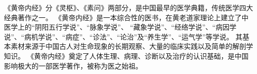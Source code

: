 《黄帝内经》分《灵枢》、《素问》两部分，是中国最早的医学典籍，传统医学四大经典著作之一。
《黄帝内经》是一本综合性的医书，在黄老道家理论上建立了中医学上的“阴阳五行学说”、“脉象学说”、
“藏象学说”、“经络学说”、“病因学说”、“病机学说”、“病症”、“诊法”、“论治”及“养生学”、“运气学”等学说。
其基本素材来源于中国古人对生命现象的长期观察、大量的临床实践以及简单的解剖学知识。
《黄帝内经》奠定了人体生理、病理、诊断以及治疗的认识基础，是中国影响极大的一部医学著作，被称为医之始祖。

